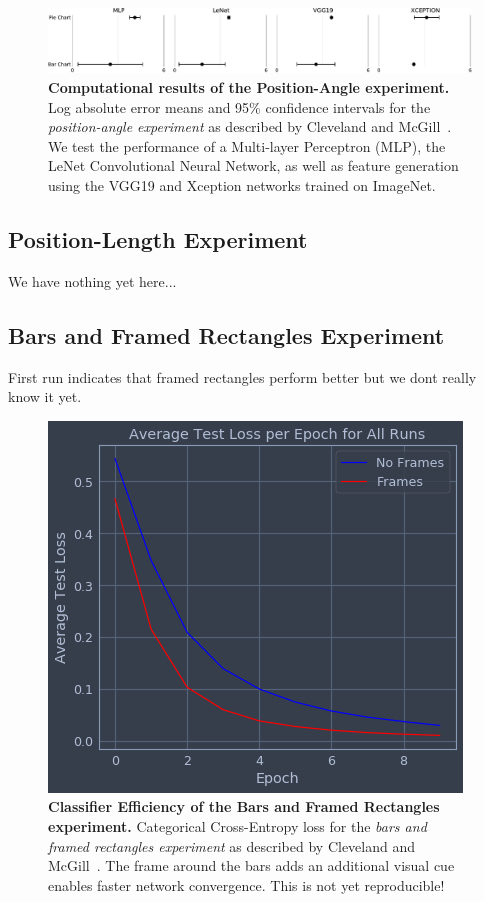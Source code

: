 \documentclass[journal]{vgtc}                %
\begin{document}
\begin{figure}[t]
	  \includegraphics[width=\linewidth]{figure3_mlae.pdf}
  \caption{\textbf{Computational results of the Position-Angle experiment.} Log absolute error means and 95\% confidence intervals for the \emph{position-angle experiment} as described by Cleveland and McGill~\cite{cleveland_mcgill}. We test the performance of a Multi-layer Perceptron (MLP), the LeNet Convolutional Neural Network, as well as feature generation using the VGG19 and Xception networks trained on ImageNet.}
	\label{fig:figure3_mlae}
\end{figure}

\subsection{Position-Length Experiment}

We have nothing yet here...


\subsection{Bars and Framed Rectangles Experiment}

First run indicates that framed rectangles perform better but we dont really know it yet.

\begin{figure}[t]
	  \includegraphics[width=\linewidth]{figure12_val_loss.png}
  \caption{\textbf{Classifier Efficiency of the Bars and Framed Rectangles experiment.} Categorical Cross-Entropy loss for the \emph{bars and framed rectangles experiment} as described by Cleveland and McGill~\cite{cleveland_mcgill}. The frame around the bars adds an additional visual cue enables faster network convergence. This is not yet reproducible!}
	\label{fig:figure12_val_loss}
\end{figure}
\end{document}
